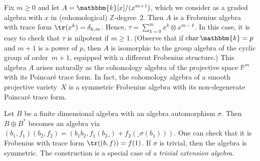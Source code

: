 \documentclass[a4paper,11pt]{amsart}
\numberwithin{equation}{subsection}
\theoremstyle{definition}
\theoremstyle{theorem}
\theoremstyle{remark}
\newcommand\kk{\mathbbm{k}}
\newcommand\Z{\mathbb{Z}}
\begin{document}
 \begin{Example}\label{Ex:FrobeniusAlgebrasHPm}
   Fix $m\ge0$ and let $A=\kk[x]/(x^{m+1})$, which we consider as a graded
  algebra with $x$ in (cohomological) $\Z$-degree~$2$. Then $A$ is a Frobenius algebra with trace form $\tr(x^k) = \delta_{k, m}$.
   Hence,
   $\tau=\sum_{k=0}^{m}x^k\otimes x^{m-k}$. In this case, it is easy
   to check that $\tau$ is nilpotent if $m\geq 1$. (Observe that if $\operatorname{char}\kk=p$ and $m+1$ is a power of $p$, then $A$ is isomorphic to
   the group algebra of the cyclic group of order~$m+1$, equipped with a
   different Frobenius structure.) This algebra $A$  arises naturally as the cohomology algebra of the
   projective space $\mathbb{P}^{m}$ with its Poincaré trace form. In fact, the cohomology algebra of a smooth projective variety~$X$ is a symmetric Frobenius algebra
   with its non-degenerate Poincaré trace form.
    \end{Example}


\begin{Example}\label{Ex:FrobeniusAlgebrastrivialext}Let $B$ be a finite dimensional algebra with an algebra automorphism $\sigma$. Then $B\oplus B^*$ becomes an algebra via $(b_1,f_1)(b_2,f_2)=(b_1b_2,f_1(b_2\_)+f_2(\_\sigma(b_1)))$. One can check that it is  Frobenius with trace form $\tr((b,f))=f(1)$. If $\sigma$ is trivial, then the algebra is symmetric. The construction is a special case of a  \emph{trivial extension algebra}.
\end{Example}
\end{document}

